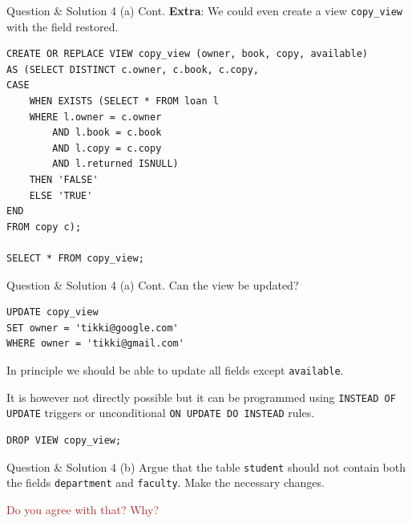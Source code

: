 \begin{frame}[fragile]{Question \& Solution 4 (a) Cont.}
\textbf{Extra}: We could even create a view \texttt{copy\_view} with the field restored.

\begin{lstlisting}
CREATE OR REPLACE VIEW copy_view (owner, book, copy, available) 
AS (SELECT DISTINCT c.owner, c.book, c.copy, 
CASE
	WHEN EXISTS (SELECT * FROM loan l  
	WHERE l.owner = c.owner
		AND l.book = c.book
		AND l.copy = c.copy 
		AND l.returned ISNULL) 
	THEN 'FALSE'
	ELSE 'TRUE' 
END
FROM copy c);

SELECT * FROM copy_view;
\end{lstlisting}

\end{frame}

\begin{frame}[fragile]{Question \& Solution 4 (a) Cont.}
Can the view be updated? 

\begin{lstlisting}
UPDATE copy_view 
SET owner = 'tikki@google.com' 
WHERE owner = 'tikki@gmail.com'
\end{lstlisting}

In principle we should be able to update all fields except \texttt{available}.  \vspace{10pt}

It is however not directly possible but it can be programmed using \texttt{INSTEAD OF UPDATE} triggers or  unconditional \texttt{ON UPDATE DO INSTEAD} rules.

\begin{lstlisting}
DROP VIEW copy_view;
\end{lstlisting}
\end{frame}

\begin{frame}[fragile]{Question \& Solution 4 (b)}
Argue that the table \texttt{student} should not contain both the fields \texttt{department} and \texttt{faculty}. Make the necessary changes. \vspace{10pt}

\textcolor{brown}{Do you agree with that? Why?}\\
\end{frame}

